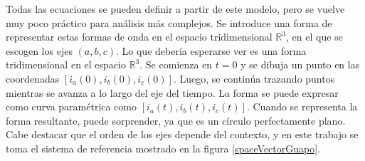 Todas las ecuaciones se pueden definir a partir de este modelo, pero se vuelve muy poco práctico para análisis más complejos. Se introduce una forma de representar estas formas de onda en el espacio tridimensional $\mathbb{R}^3$, en el que se escogen los ejes \((a, b, c)\). Lo que debería esperarse ver es una forma tridimensional en el espacio $\mathbb{R}^3$. Se comienza en \(t = 0\) y se dibuja un punto en las coordenadas \([i_a(0), i_b(0), i_c(0)]\). Luego, se continúa trazando puntos mientras se avanza a lo largo del eje del tiempo. La forma se puede expresar como curva paramétrica como \([i_a(t), i_b(t), i_c(t)]\). Cuando se representa la forma resultante, puede sorprender, ya que es un círculo perfectamente plano. Cabe destacar que el orden de los ejes depende del contexto, y en este trabajo se toma el sistema de referencia mostrado en la figura \ref{spaceVectorGuapo}.



